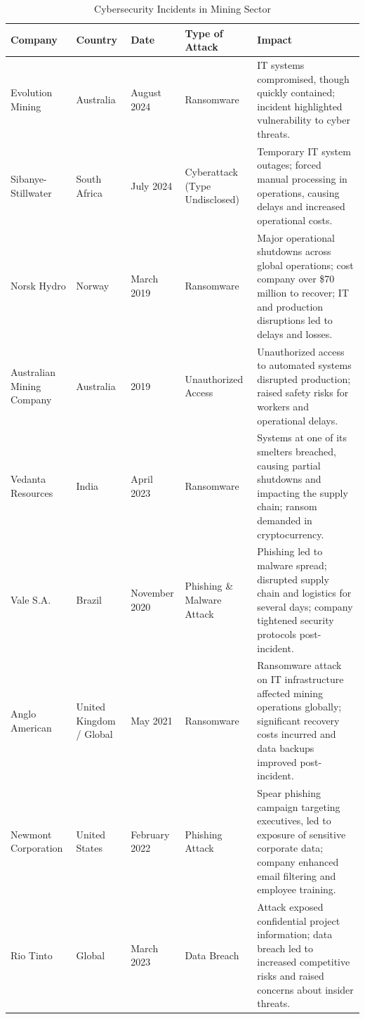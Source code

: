 \documentclass[a4paper,twoside,12pt]{report}
\begin{document}
\begin{longtable}{|p{2.5cm}|p{1.7cm}|p{1.5cm}|p{2.5cm}|p{5.5cm}|}
    \caption{Cybersecurity Incidents in Mining Sector} \label{table:incidents_history}\\ %
    \hline
    \textbf{Company} & \textbf{Country} & \textbf{Date} & \textbf{Type of Attack} & \textbf{Impact} \\
    \hline
    Evolution Mining \citet{evolution2024} & Australia & August 2024 & Ransomware & IT systems compromised, though quickly contained; incident highlighted vulnerability to cyber threats. \\
    \hline
    Sibanye-Stillwater \citet{cameron2024sibanye} & South Africa & July 2024 & Cyberattack (Type Undisclosed) & Temporary IT system outages; forced manual processing in operations, causing delays and increased operational costs. \\
    \hline
    Norsk Hydro \citet{ravichandran2024comprehensive} & Norway & March 2019 & Ransomware & Major operational shutdowns across global operations; cost company over \$70 million to recover; IT and production disruptions led to delays and losses. \\
    \hline
    Australian Mining Company & Australia & 2019 & Unauthorized Access & Unauthorized access to automated systems disrupted production; raised safety risks for workers and operational delays. \\
    \hline
    Vedanta Resources & India & April 2023 & Ransomware & Systems at one of its smelters breached, causing partial shutdowns and impacting the supply chain; ransom demanded in cryptocurrency. \\
    \hline
    Vale S.A. & Brazil & November 2020 & Phishing \& Malware Attack & Phishing led to malware spread; disrupted supply chain and logistics for several days; company tightened security protocols post-incident. \\
    \hline
    Anglo American & United Kingdom / Global & May 2021 & Ransomware & Ransomware attack on IT infrastructure affected mining operations globally; significant recovery costs incurred and data backups improved post-incident. \\
    \hline
    Newmont Corporation & United States & February 2022 & Phishing Attack & Spear phishing campaign targeting executives, led to exposure of sensitive corporate data; company enhanced email filtering and employee training. \\
    \hline
    Rio Tinto & Global & March 2023 & Data Breach & Attack exposed confidential project information; data breach led to increased competitive risks and raised concerns about insider threats. \\
    \hline
\end{longtable}
\end{document}
